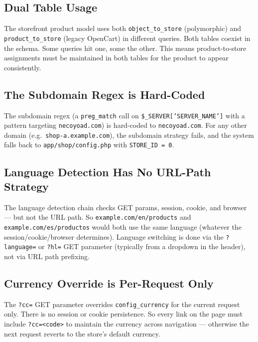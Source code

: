 \documentclass[11pt,a4paper]{article}
\begin{document}
\subsection{Dual Table Usage}

\begin{findingbox}
The storefront product model uses both
\texttt{object\_to\_store} (polymorphic) and
\texttt{product\_to\_store} (legacy OpenCart) in different queries.
Both tables coexist in the schema. Some queries hit one, some the
other. This means product-to-store assignments must be maintained
in both tables for the product to appear consistently.
\end{findingbox}

\subsection{The Subdomain Regex is Hard-Coded}

\begin{findingbox}
The subdomain regex (a \texttt{preg\_match} call on
\texttt{\$\_SERVER['SERVER\_NAME']} with a pattern targeting
\texttt{necoyoad.com}) is hard-coded to
\texttt{necoyoad.com}. For any other domain (e.g.\
\texttt{shop-a.example.com}), the subdomain strategy fails, and the
system falls back to \texttt{app/shop/config.php} with
\texttt{STORE\_ID = 0}.
\end{findingbox}

\subsection{Language Detection Has No URL-Path Strategy}

The language detection chain checks GET params, session, cookie, and
browser --- but not the URL path. So
\texttt{example.com/en/products} and \texttt{example.com/es/productos}
would both use the same language (whatever the session/cookie/browser
determines). Language switching is done via the
\texttt{?language=} or \texttt{?hl=} GET parameter (typically from a
dropdown in the header), not via URL path prefixing.

\subsection{Currency Override is Per-Request Only}

The \texttt{?cc=} GET parameter overrides \texttt{config\_currency}
for the current request only. There is no session or cookie
persistence. So every link on the page must include
\texttt{?cc=<code>} to maintain the currency across navigation ---
otherwise the next request reverts to the store's default currency.
\end{document}
